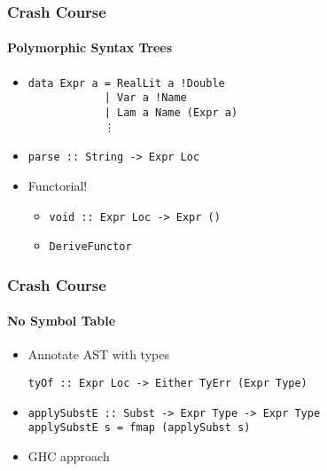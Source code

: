 \documentclass{beamer}
\begin{document}

\begin{frame}[fragile]
  \frametitle{Crash Course}
  \framesubtitle{Polymorphic Syntax Trees}
    \begin{itemize}
      \item
      \begin{verbatim}
data Expr a = RealLit a !Double
            | Var a !Name
            | Lam a Name (Expr a)
            ⋮
\end{verbatim}
      \item \verb|parse :: String -> Expr Loc|
      \item Functorial!
        \begin{itemize}
          \item \verb|void :: Expr Loc -> Expr ()|
          \item \verb|DeriveFunctor|
        \end{itemize}
    \end{itemize}
\end{frame}

\begin{frame}[fragile]
  \frametitle{Crash Course}
  \framesubtitle{No Symbol Table}
  \begin{itemize}
      \item Annotate AST with types
        \begin{verbatim}
tyOf :: Expr Loc -> Either TyErr (Expr Type)
        \end{verbatim}
      \item
        \begin{verbatim}
applySubstE :: Subst -> Expr Type -> Expr Type
applySubstE s = fmap (applySubst s)
        \end{verbatim}
      \item GHC approach
  \end{itemize}
\end{frame}


\end{document}
